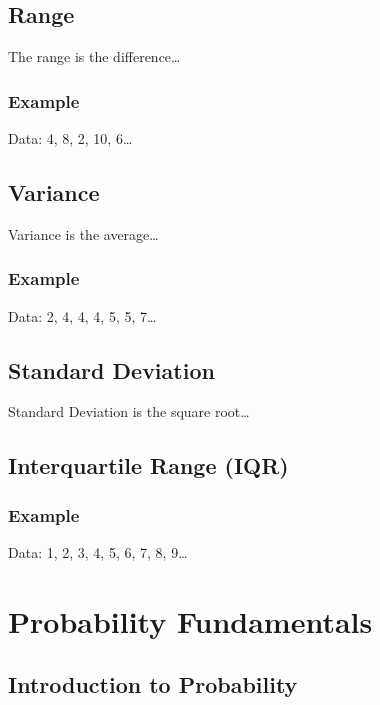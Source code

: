 \documentclass[
  letterpaper,
  DIV=11,
  numbers=noendperiod]{scrreprt}
\begin{document}
\section{Range}\label{range}

The range is the difference\ldots{}

\subsection{Example}\label{example}

Data: 4, 8, 2, 10, 6\ldots{}

\section{Variance}\label{variance}

Variance is the average\ldots{}

\subsection{Example}\label{example-1}

Data: 2, 4, 4, 4, 5, 5, 7\ldots{}

\section{Standard Deviation}\label{standard-deviation}

Standard Deviation is the square root\ldots{}

\section{Interquartile Range (IQR)}\label{interquartile-range-iqr}

\subsection{Example}\label{example-2}

Data: 1, 2, 3, 4, 5, 6, 7, 8, 9\ldots{}


\chapter{Probability Fundamentals}\label{probability-fundamentals}

\section{Introduction to Probability}\label{introduction-to-probability}
\end{document}
